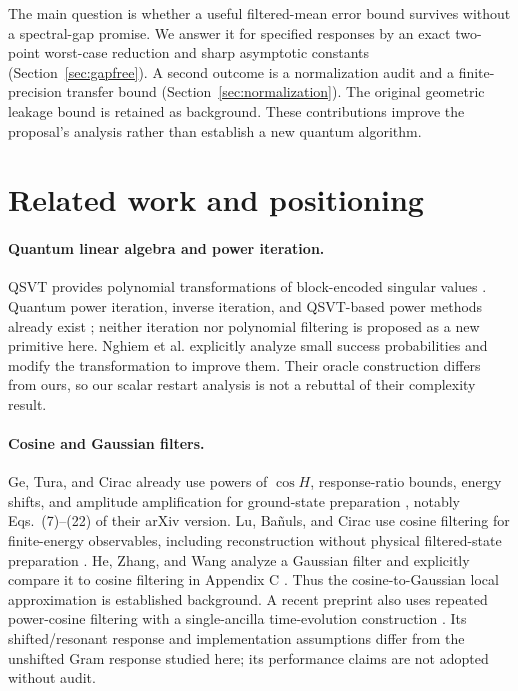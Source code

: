 \documentclass[11pt]{article}
\begin{document}
The main question is whether a useful filtered-mean error bound survives without a spectral-gap promise. We answer it for specified responses by an exact two-point worst-case reduction and sharp asymptotic constants (Section~\ref{sec:gapfree}). A second outcome is a normalization audit and a finite-precision transfer bound (Section~\ref{sec:normalization}). The original geometric leakage bound is retained as background. These contributions improve the proposal's analysis rather than establish a new quantum algorithm.

\section{Related work and positioning}
\paragraph{Quantum linear algebra and power iteration.}
QSVT provides polynomial transformations of block-encoded singular values
\cite{Gilyen}. Quantum power iteration, inverse iteration, and QSVT-based
power methods already exist \cite{SekiYunoki,Kyriienko,Nghiem}; neither
iteration nor polynomial filtering is proposed as a new primitive here.
Nghiem et al. explicitly analyze small success probabilities and modify the
transformation to improve them. Their oracle construction differs from ours,
so our scalar restart analysis is not a rebuttal of their complexity result.

\paragraph{Cosine and Gaussian filters.}
Ge, Tura, and Cirac already use powers of $\cos H$, response-ratio bounds,
energy shifts, and amplitude amplification for ground-state preparation
\cite{GeTuraCirac}, notably Eqs.~(7)--(22) of their arXiv version.
Lu, Ba\~nuls, and Cirac use cosine filtering for finite-energy observables,
including reconstruction without physical filtered-state preparation
\cite{LuBanulsCirac}. He, Zhang, and Wang analyze a Gaussian filter and
explicitly compare it to cosine filtering in Appendix C \cite{HeZhangWang}.
Thus the cosine-to-Gaussian local approximation is established background.
A recent preprint also uses repeated power-cosine filtering with a
single-ancilla time-evolution construction \cite{Jo}. Its shifted/resonant
response and implementation assumptions differ from the unshifted Gram
response studied here; its performance claims are not adopted without audit.
\end{document}

